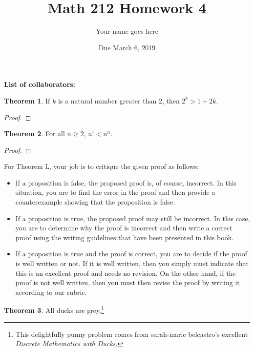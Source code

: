 \documentclass[11pt]{article}		%
\title{Math 212 Homework 4}
\author{Your name goes here}
\date{Due March 6, 2019}
\theoremstyle{definition}
\newtheorem{theorem}{Theorem}
\begin{document}
\maketitle

\noindent\textbf{List of collaborators:}

\begin{theorem}
	If $k$ is a natural number greater than 2, then $2^k > 1 + 2k$.
\end{theorem}

\begin{proof}

\end{proof}


\begin{theorem}
	For all $n\ge 2$, $n! < n^n$.
\end{theorem}

\begin{proof}

\end{proof}

\noindent For Theorem L, your job is to critique the given proof as follows:

\begin{itemize}\footnotesize
	\item If a proposition is false, the proposed proof is, of course, incorrect. In this situation, you are to find the error in the proof and then provide a counterexample showing that the proposition is false.
	\item  If a proposition is true, the proposed proof may still be incorrect. In this case, you are to determine why the proof is incorrect and then write a correct proof using the writing guidelines that have been presented in this book.
	\item If a proposition is true and the proof is correct, you are to decide if the proof is well written or not. If it is well written, then you simply must indicate that this is an excellent proof and needs no revision. On the other hand, if the proof is not well written, then you must then revise the proof by writing it according to our rubric.
\end{itemize}

\begin{theorem}
	All ducks are grey.\footnote{This delightfully punny problem comes from sarah-marie belcastro's excellent \emph{Discrete Mathematics with Ducks}.}
\end{theorem}
\end{document}
